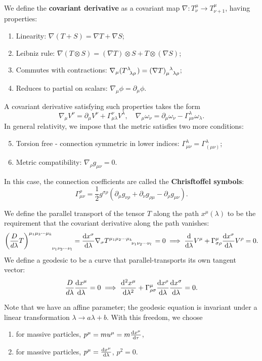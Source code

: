 \documentclass{article}
\begin{document}
We define the \textbf{covariant derivative} as a covariant map $\nabla:T^\mu_\nu\to T^\mu_{\nu+1}$, having properties:
\begin{enumerate}
    \item Linearity: $\nabla(T+S)=\nabla T+\nabla S$;
    \item Leibniz rule: $\nabla(T\otimes S)=(\nabla T)\otimes S+T\otimes(\nabla S)$;
    \item Commutes with contractions: $\nabla_\mu(T\indices{^\lambda_{\lambda\rho}})=(\nabla T)\indices{_\mu^\lambda_{\lambda\rho}}$;
    \item Reduces to partial on scalars: $\nabla_\mu\phi=\partial_\mu\phi$.
\end{enumerate}
A covariant derivative satisfying such properties takes the form 
$$\nabla_\mu V^\nu=\partial_\mu V^\nu+\Gamma^\nu_{\mu\lambda}V^\lambda,\quad \nabla_\mu\omega_\nu=\partial_\mu\omega_\nu-\Gamma^\lambda_{\mu\nu}\omega_\lambda.$$
In general relativity, we impose that the metric satisfies two more conditions:

\begin{enumerate}
  \setcounter{enumi}{4}
  \item Torsion free - connection symmetric in lower indices: $\Gamma^\lambda_{\mu\nu}=\Gamma^\lambda_{(\mu\nu)}$;
  \item Metric compatibility: $\nabla_\rho g_{\mu\nu}=0$.
\end{enumerate}

In this case, the connection coefficients are called the \textbf{Chrisftoffel symbols}:
$$\Gamma^\rho_{\mu\nu}=\frac 12g^{\sigma\rho}(\partial_\mu g_{\nu\rho}+\partial_\nu g_{\rho\mu}-\partial_\rho g_{\mu\nu}).$$

We define the parallel transport of the tensor $T$ along the path $x^\mu(\lambda)$ to be the requirement that the covariant derivative along the path vanishes:
$$\left(\frac{D}{d\lambda}T\right)\indices{^{\mu_1\mu_2\cdots\mu_k}_{\nu_1\nu_2\cdots\nu_l}}=\ode {x^\sigma}\lambda\nabla_\sigma T\indices{^{\mu_1\mu_2\cdots\mu_k}_{\nu_1\nu_2\cdots\nu_l}}=0\implies \ode{}{\lambda}V^\mu+\Gamma^\mu_{\sigma\rho}\ode{x^\sigma}\lambda V^\rho=0.$$
We define a geodesic to be a curve that parallel-transports its own tangent vector:
$$\frac{D}{d\lambda}\frac{\mathrm{d}x^\mu}{\mathrm{d}\lambda}=0\implies\frac{\mathrm{d}^{2}x^\mu}{\mathrm{d}{\lambda}^{2}}+\Gamma^\mu_{\rho\sigma}\frac{\mathrm{d}x^\rho}{\mathrm{d}\lambda}\frac{\mathrm{d}x^\sigma}{\mathrm{d}\lambda}=0.$$

Note that we have an affine parameter; the geodesic equation is invariant under a linear transformation $\lambda\to a\lambda+b.$ With this freedom, we choose
\begin{enumerate}
    \item for massive particles, $p^\mu=mu^\mu=m\frac{\mathrm{d}x^\mu}{\mathrm{d}\tau}$,
    \item for massive particles, $p^\mu=\frac{\mathrm{d}x^\mu}{\mathrm{d}\lambda}$, $p^2=0$.
\end{enumerate}
\end{document}

